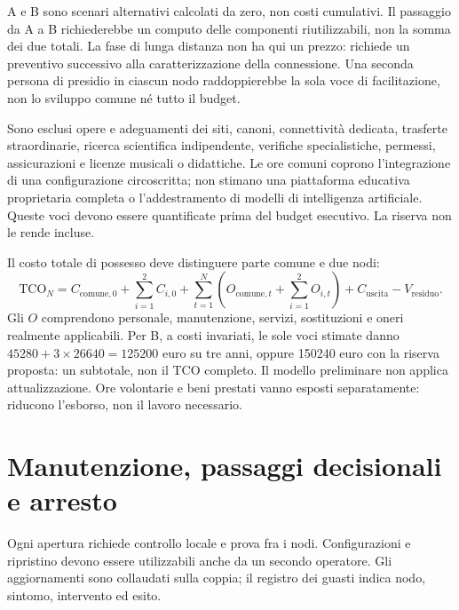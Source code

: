 A e B sono scenari alternativi calcolati da zero, non costi cumulativi.
Il passaggio da A a B richiederebbe un computo delle componenti riutilizzabili,
non la somma dei due totali. La fase di lunga distanza non ha qui un prezzo:
richiede un preventivo successivo alla caratterizzazione della connessione.
Una seconda persona di presidio in ciascun nodo raddoppierebbe la sola
voce di facilitazione, non lo sviluppo comune né tutto il budget.

Sono esclusi opere e adeguamenti dei siti, canoni, connettività dedicata,
trasferte straordinarie, ricerca scientifica indipendente, verifiche
specialistiche, permessi, assicurazioni e licenze musicali o didattiche.
Le ore comuni coprono l'integrazione di una configurazione circoscritta;
non stimano una piattaforma educativa proprietaria completa o l'addestramento
di modelli di intelligenza artificiale. Queste voci devono essere
quantificate prima del budget esecutivo. La riserva non le rende incluse.

Il costo totale di possesso deve distinguere parte comune e due nodi:
\[
\mathrm{TCO}_{N}=C_{\mathrm{comune},0}
+\sum_{i=1}^{2} C_{i,0}
+\sum_{t=1}^{N}\left(O_{\mathrm{comune},t}
+\sum_{i=1}^{2}O_{i,t}\right)
+C_{\mathrm{uscita}}-V_{\mathrm{residuo}}.
\]
Gli $O$ comprendono personale, manutenzione, servizi, sostituzioni e oneri
realmente applicabili. Per B, a costi invariati, le sole voci stimate danno
$45280+3\times26640=125200$ euro su tre anni, oppure 150240 euro con
la riserva proposta: un subtotale, non il TCO completo. Il modello
preliminare non applica attualizzazione. Ore volontarie e beni prestati
vanno esposti separatamente: riducono l'esborso, non il lavoro necessario.

\section{Manutenzione, passaggi decisionali e arresto}
Ogni apertura richiede controllo locale e prova fra i nodi. Configurazioni
e ripristino devono essere utilizzabili anche da un secondo operatore.
Gli aggiornamenti sono collaudati sulla coppia; il registro dei guasti
indica nodo, sintomo, intervento ed esito.

